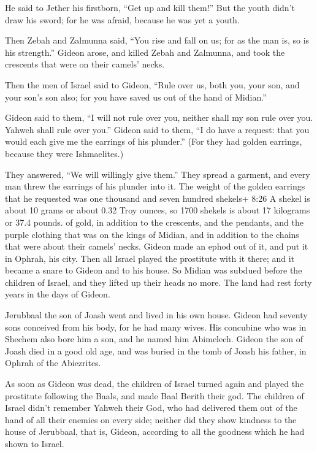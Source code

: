  He said to Jether his firstborn, ``Get up and kill them!''
But the youth didn't draw his sword; for he was afraid, because he was
yet a youth.

 Then Zebah and Zalmunna said, ``You rise and fall on us;
for as the man is, so is his strength.'' Gideon arose, and killed Zebah
and Zalmunna, and took the crescents that were on their camels' necks.

 Then the men of Israel said to Gideon, ``Rule over us,
both you, your son, and your son's son also; for you have saved us out
of the hand of Midian.''

 Gideon said to them, ``I will not rule over you, neither
shall my son rule over you. Yahweh shall rule over you.'' 
Gideon said to them, ``I do have a request: that you would each give me
the earrings of his plunder.'' (For they had golden earrings, because
they were Ishmaelites.)

 They answered, ``We will willingly give them.'' They
spread a garment, and every man threw the earrings of his plunder into
it.  The weight of the golden earrings that he requested
was one thousand and seven hundred shekels+ 8:26 A shekel is about 10
grams or about 0.32 Troy ounces, so 1700 shekels is about 17 kilograms
or 37.4 pounds. of gold, in addition to the crescents, and the pendants,
and the purple clothing that was on the kings of Midian, and in addition
to the chains that were about their camels' necks.  Gideon
made an ephod out of it, and put it in Ophrah, his city. Then all Israel
played the prostitute with it there; and it became a snare to Gideon and
to his house.  So Midian was subdued before the children of
Israel, and they lifted up their heads no more. The land had rest forty
years in the days of Gideon.

 Jerubbaal the son of Joash went and lived in his own
house.  Gideon had seventy sons conceived from his body,
for he had many wives.  His concubine who was in Shechem
also bore him a son, and he named him Abimelech.  Gideon
the son of Joash died in a good old age, and was buried in the tomb of
Joash his father, in Ophrah of the Abiezrites.

 As soon as Gideon was dead, the children of Israel turned
again and played the prostitute following the Baals, and made Baal
Berith their god.  The children of Israel didn't remember
Yahweh their God, who had delivered them out of the hand of all their
enemies on every side;  neither did they show kindness to
the house of Jerubbaal, that is, Gideon, according to all the goodness
which he had shown to Israel.

